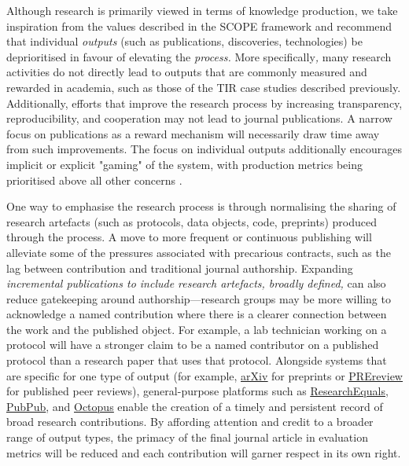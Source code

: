 \documentclass[authordate,meta]{jote-new-article}
\begin{document}
Although research is primarily viewed in terms of knowledge production, we take inspiration from the values described in the SCOPE framework \parencites{INORMS2022} and recommend that individual \emph{outputs} (such as publications, discoveries, technologies) be deprioritised in favour of elevating the \emph{process.} More specifically\emph{, }many research activities do not directly lead to outputs that are commonly measured and rewarded in academia,\emph{ }such as those of the TIR case studies described previously. Additionally, efforts that improve the research process by increasing transparency, reproducibility, and cooperation may not lead to journal publications. A narrow focus on publications as a reward mechanism will necessarily draw time away from such improvements. The focus on individual outputs additionally encourages implicit or explicit "gaming" of the system, with production metrics being prioritised above all other concerns \parencites[Goodhart's law;][]{Goodhart1984}.



One way to emphasise the research process is through normalising the sharing of research artefacts (such as protocols, data objects, code, preprints) produced through the process. A move to more frequent or continuous publishing will alleviate some of the pressures associated with precarious contracts, such as the lag between contribution and traditional journal authorship. Expanding \emph{incremental publications to include research artefacts, broadly defined, }can also reduce gatekeeping around authorship—research groups may be more willing to acknowledge a named contribution where there is a clearer connection between the work and the published object. For example, a lab technician working on a protocol will have a stronger claim to be a named contributor on a published protocol than a research paper that uses that protocol. Alongside systems that are specific for one type of output (for example, \href{https://arxiv.org}{\underline{arXiv}} for preprints or \href{https://prereview.org}{\underline{PREreview}} for published peer reviews), general-purpose platforms such as \href{https://www.researchequals.com}{\underline{ResearchEquals}}, \href{https://www.pubpub.org/}{\underline{PubPub}}, and \href{https://blog.science-octopus.org}{\underline{Octopus}} enable the creation of a timely and persistent record of broad research contributions. By affording attention and credit to a broader range of output types, the primacy of the final journal article in evaluation metrics will be reduced and each contribution will garner respect in its own right.
\end{document}
